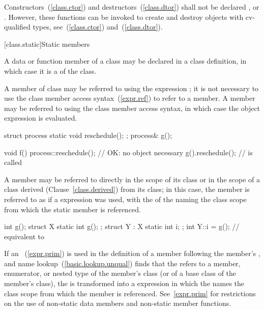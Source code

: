 \pnum
{}%
%
%
%
Constructors~(\ref{class.ctor}) and destructors~(\ref{class.dtor}) shall
not be declared ,  or 
. \enternote However, these functions can be invoked to
create and destroy objects with cv-qualified types,
see~(\ref{class.ctor}) and~(\ref{class.dtor}).
\exitnote

[class.static]{Static members}%
%
%

\pnum
A data or function member of a class may be declared  in a
class definition, in which case it is a  of the class.

\pnum
A  member  of class  may be referred to
using the  expression ; it is not
necessary to use the class member access syntax~(\ref{expr.ref}) to
refer to a  member. A  member may be
referred to using the class member access syntax, in which case the
object expression is evaluated.
\enterexample

\begin{codeblock}
struct process {
  static void reschedule();
};
process& g();

void f() {
  process::reschedule();        // OK: no object necessary
  g().reschedule();             //  is called
}
\end{codeblock}
\exitexample

\pnum
A  member may be referred to directly in the scope of its
class or in the scope of a class derived (Clause~\ref{class.derived})
from its class; in this case, the  member is referred to
as if a  expression was used, with the
 of the  naming
the class scope from which the static member is referenced.
\enterexample

\begin{codeblock}
int g();
struct X {
  static int g();
};
struct Y : X {
  static int i;
};
int Y::i = g();                 // equivalent to 
\end{codeblock}
\exitexample

\pnum
If an ~(\ref{expr.prim}) is used in the
definition of a  member following the member's
, and name lookup~(\ref{basic.lookup.unqual})
finds that the  refers to a 
member, enumerator, or nested type of the member's class (or of a base
class of the member's class), the  is
transformed into a  expression in which the
 names the class scope from which the
member is referenced.
\enternote
See~\ref{expr.prim} for restrictions on the use of non-static data
members and non-static member functions.
\exitnote



